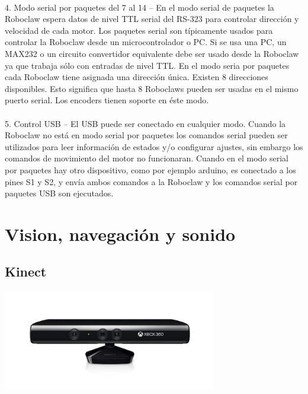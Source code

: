\documentclass[a4paper,usenames,dvipsnames,svgnames,table]{book}
\begin{document}
\\
4. Modo serial por paquetes del 7 al 14 – En el modo serial de paquetes la Roboclaw espera datos de nivel TTL serial del 
RS-323 para controlar dirección y velocidad de cada motor. Los paquetes serial son típicamente usados para controlar la 
Roboclaw desde un microcontrolador o PC. Si se usa una PC, un MAX232 o un circuito convertidor equivalente debe ser usado 
desde la Roboclaw ya que trabaja sólo con entradas de nivel TTL. En el modo seria por paquetes cada Roboclaw tiene asignada
una dirección única. Existen 8 direcciones disponibles. Esto significa que hasta 8 Roboclaws pueden ser usadas en el mismo 
puerto serial. Los encoders tienen soporte en éste modo.\\
\\
5. Control USB – El USB puede ser conectado en cualquier modo. Cuando la Roboclaw no está en modo serial por paquetes los
comandos serial pueden ser utilizados para leer información de estados y/o configurar ajustes, sin embargo los comandos de 
movimiento del motor no funcionaran. Cuando en el modo serial por paquetes hay otro dispositivo, como por ejemplo arduino, 
es conectado a los pines S1 y S2, y envía ambos comandos a la Roboclaw y los comandos serial por paquetes USB son ejecutados.\\

\vfill

\section{Vision, navegación y sonido}
\subsection{Kinect}

\begin{center}
\includegraphics[width=0.7\textwidth]{Figures/Hardware/Partes/Kinect.png}
\label{fig:Hardware:Partes:Kinect}
\end{center}
\end{document}

